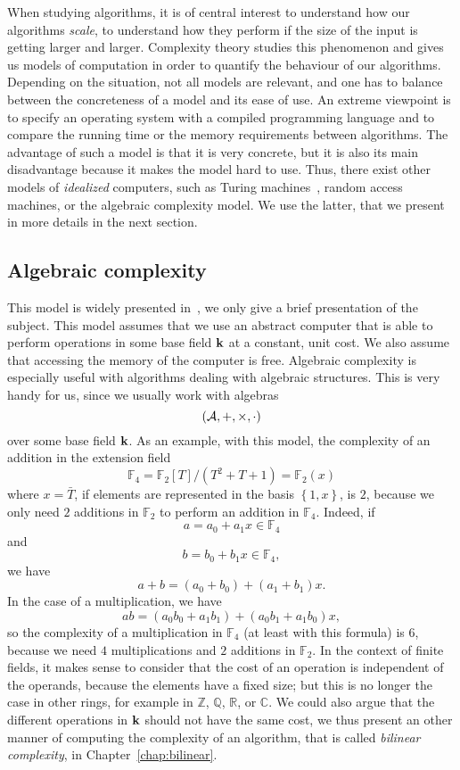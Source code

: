 When studying algorithms, it is of central interest to understand how our algorithms
\emph{scale}, \ie to understand how they perform if the size of the input is
getting larger and larger. Complexity theory studies this phenomenon and gives us models
of computation in order to quantify the behaviour of our algorithms. Depending
on the situation, not all models are relevant, and one has to balance between
the concreteness of a model and its ease of use. An extreme viewpoint is to
specify an operating system with a compiled programming language and to compare
the running time or the memory requirements between algorithms. The advantage of
such a model is that it is very concrete, but it is also its main disadvantage
because it makes the model hard to use. Thus, there exist other models of
\emph{idealized} computers, such as Turing machines~\cite{Papadimitriou03},
random access machines, or the algebraic complexity model.
We use the latter, that we present in more details in the next section.

\subsection{Algebraic complexity}

This model is widely presented in~\cite{BCS13}, we only give a brief
presentation of the subject. This model assumes that we use an abstract computer
that is able to perform operations in some base field $\mathbf{k}$ at a constant, unit
cost. We also assume that accessing the memory of the computer is free.
Algebraic complexity is especially useful with algorithms dealing with
algebraic structures. This is very handy for us, since
we usually work with algebras
\[
  (\mathcal{A}, +, \times, \cdot)
\]
over some base field $\mathbf{k}$. As an example, with this model, the complexity of an
addition in the extension field
\[
  \mathbb{F}_4 = \mathbb{F}_2[T]/(T^2+T+1) = \mathbb{F}_2(x)
\]
where $x=\bar T$, if elements are represented in the basis $\left\{ 1, x
\right\}$, is $2$, because we only need $2$ additions in $\mathbb{F}_2$ to
perform an addition in $\mathbb{F}_4$. Indeed, if
\[
  a = a_0 + a_1x\in\mathbb{F}_4
\]
and
\[
  b = b_0 + b_1x\in\mathbb{F}_4,
\]
we have
\[
  a+b = (a_0+b_0)+(a_1+b_1)x.
\]
In the case of a multiplication, we have
\[
  ab = (a_0b_0+a_1b_1) + (a_0b_1+a_1b_0)x,
\]
so the complexity of a multiplication in $\mathbb{F}_4$ (at least with this
formula) is $6$, because we need
$4$ multiplications and $2$ additions in $\mathbb{F}_2$. In the context of
finite fields, it makes sense to consider that the cost of an operation is
independent of the operands, because the elements have a fixed size; but this is
no longer the case in other rings, for example in $\mathbb{Z}$, $\mathbb{Q}$,
$\mathbb{R}$, or $\mathbb{C}$. We could also argue that the different operations
in $\mathbf{k}$ should not have the same cost, we thus present an other manner of
computing the complexity of an algorithm, that is called \emph{bilinear
complexity}, in Chapter~\ref{chap:bilinear}.


